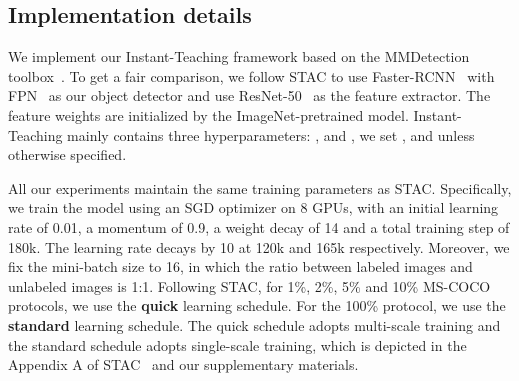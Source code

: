 \documentclass[final]{cvpr}
\begin{document}
\subsection{Implementation details}



We implement our Instant-Teaching framework based on the MMDetection toolbox~\cite{mmdetection}. To get a fair comparison, we follow STAC to use Faster-RCNN~\cite{shaoqing2017faster} with FPN~\cite{lin2017feature} as our object detector and use ResNet-50~\cite{he2016deep} as the feature extractor. The feature weights are initialized by the ImageNet-pretrained model.
Instant-Teaching mainly contains three hyperparameters: ,  and , we set ,  and  unless otherwise specified.

All our experiments maintain the same training parameters as STAC. 
Specifically, we train the model using an SGD optimizer on 8 GPUs, with an initial learning rate of 0.01, a momentum of 0.9, a weight decay of 14 and a total training step of 180k. The learning rate decays by 10 at 120k and 165k respectively. Moreover, we fix the mini-batch size to 16, in which the ratio between labeled images and unlabeled images is 1:1.
Following STAC, for 1\%, 2\%, 5\% and 10\% MS-COCO protocols, we use the \textbf{quick} learning schedule. For the 100\% protocol, we use the \textbf{standard} learning schedule.
The quick schedule adopts multi-scale training and the standard schedule adopts single-scale training, which is depicted in the Appendix A of STAC~\cite{sohn2020simple} and our supplementary materials.
\end{document}
